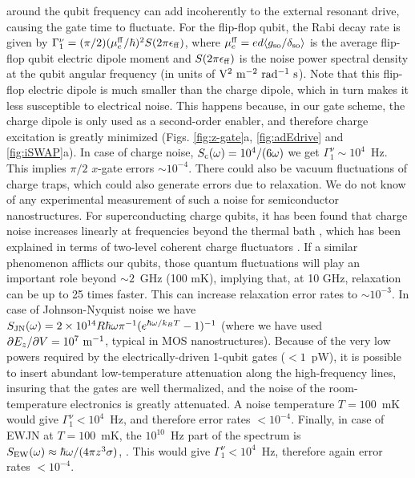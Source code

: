 around the qubit frequency can add incoherently to the external resonant drive, causing the gate time to fluctuate. For the flip-flop qubit, the Rabi decay rate is given by $\Gamma_1^\nu=(\pi/2)(\mu_e^{\rm ff}/\hbar)^2S(2\pi\epsilon_{\rm ff})$, where $\mu_e^{\rm ff}=ed\langle g_{\rm so}/\delta_{\rm so}\rangle$ is the average flip-flop qubit electric dipole moment and $S(2\pi\epsilon_{\rm ff})$ is the noise power spectral density at the qubit angular frequency (in units of ${\rm V^2~m^{-2}~rad^{-1}~s}$). Note that this flip-flop electric dipole is much smaller than the charge dipole, which in turn makes it less susceptible to electrical noise. This happens because, in our gate scheme, the charge dipole is only used as a second-order enabler, and therefore charge excitation is greatly minimized (Figs. \ref{fig:z-gate}a, \ref{fig:adEdrive} and \ref{fig:iSWAP}a). In case of charge noise, $S_{\rm c}(\omega)=10^4/(6\omega)$ we get $\Gamma_1^\nu\sim10^4$~Hz. This implies $\pi/2$ $x$-gate errors $\sim10^{-4}$. There could also be vacuum fluctuations of charge traps, which could also generate errors due to relaxation. We do not know of any experimental measurement of such a noise for semiconductor nanostructures. For superconducting charge qubits, it has been found that charge noise increases linearly at frequencies beyond the thermal bath \cite{Astafiev2004}, which has been explained in terms of two-level coherent charge fluctuators \cite{Shnirman2005}. If a similar phenomenon afflicts our qubits, those quantum fluctuations will play an important role beyond $\sim2$~GHz (100 mK), implying that, at 10 GHz, relaxation can be up to 25 times faster. This can increase relaxation error rates to $\sim10^{-3}$. In case of Johnson-Nyquist noise we have $S_{\rm JN}(\omega)= 2\times10^{14}R\hbar\omega\pi^{-1}(e^{\hbar\omega/k_BT}-1)^{-1}$ (where we have used $\partial E_z/\partial V=10^7~{\rm m^{-1}}$, typical in MOS nanostructures). Because of the very low powers required by the electrically-driven 1-qubit gates ($<1$~pW), it is possible to insert abundant low-temperature attenuation along the high-frequency lines, insuring that the gates are well thermalized, and the noise of the room-temperature electronics is greatly attenuated. A noise temperature $T=100$~mK would give $\Gamma_1^\nu<10^4$~Hz, and therefore error rates $<10^{-4}$. Finally, in case of EWJN at $T=100$~mK, the $10^{10}$~Hz part of the spectrum is  $S_{\rm EW}(\omega)\approx\hbar\omega/(4\pi z^3\sigma)$, \cite{Henkel1999,Poudel2013}. This would give $\Gamma_1^\nu<10^4$~Hz, therefore again error rates $<10^{-4}$.

